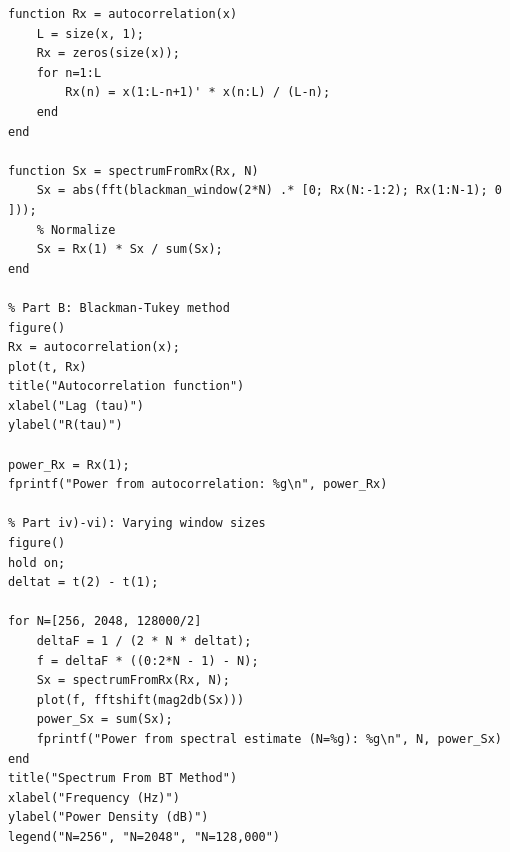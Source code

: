 \documentclass{homework}
\begin{document}
\begin{lstlisting}
function Rx = autocorrelation(x)
    L = size(x, 1);
    Rx = zeros(size(x));
    for n=1:L
        Rx(n) = x(1:L-n+1)' * x(n:L) / (L-n);
    end
end

function Sx = spectrumFromRx(Rx, N)
    Sx = abs(fft(blackman_window(2*N) .* [0; Rx(N:-1:2); Rx(1:N-1); 0 ]));
    % Normalize
    Sx = Rx(1) * Sx / sum(Sx);
end

% Part B: Blackman-Tukey method
figure()
Rx = autocorrelation(x);
plot(t, Rx)
title("Autocorrelation function")
xlabel("Lag (tau)")
ylabel("R(tau)")

power_Rx = Rx(1);
fprintf("Power from autocorrelation: %g\n", power_Rx)

% Part iv)-vi): Varying window sizes
figure()
hold on;
deltat = t(2) - t(1);

for N=[256, 2048, 128000/2]
    deltaF = 1 / (2 * N * deltat);
    f = deltaF * ((0:2*N - 1) - N);
    Sx = spectrumFromRx(Rx, N);
    plot(f, fftshift(mag2db(Sx)))
    power_Sx = sum(Sx);
    fprintf("Power from spectral estimate (N=%g): %g\n", N, power_Sx)
end
title("Spectrum From BT Method")
xlabel("Frequency (Hz)")
ylabel("Power Density (dB)")
legend("N=256", "N=2048", "N=128,000")
\end{lstlisting}
\end{document}
